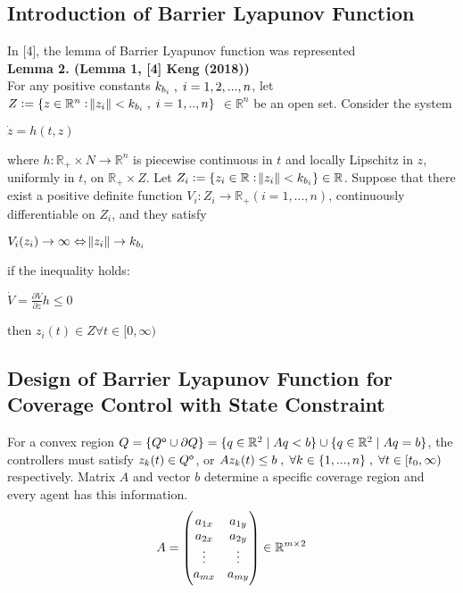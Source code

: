 \subsection{Introduction of Barrier Lyapunov Function}
In [4], the lemma of Barrier Lyapunov function was represented\\
\textbf{Lemma 2. (Lemma 1, [4] Keng (2018))} \\
For any positive constants ${k_{b_i} \txtspc{,} i = 1,2,...,n}$, let ${Z := \{z \in \mathbb{R}^n: \norm{z_i} < k_{b_i} \txtspc{,} i = 1,..,n\}}$ ${\in \mathbb{R}^n}$ be an open set. Consider the system \\
\begin{tightcenter}
	${\dot{z} = h(t,z)}$
\end{tightcenter}
where ${h : \mathbb{R}_+ \times N \rightarrow \mathbb{R}^n}$ is piecewise continuous in ${t}$ and locally Lipschitz in ${z}$, uniformly in ${t}$, on ${\mathbb{R}_+ \times Z}$. Let ${Z_i := \{z_i \in \mathbb{R}: \norm{z_i} < k_{b_i}\} \in \mathbb{R}}$. Suppose that there exist a positive definite function ${V_i : Z_i \rightarrow \mathbb{R}_+ (i = 1,...,n)}$, continuously differentiable on ${Z_i}$, and they satisfy \\
\begin{tightcenter}
${V_i(z_i) \rightarrow \infty \Leftrightarrow \norm{z_i} \rightarrow k_{b_i}}$ \\
\end{tightcenter}
if the inequality holds: \\
\begin{tightcenter}
${\dot{V} = \frac{\partial V}{\partial z}h \leq 0}$
\end{tightcenter}
then ${z_i(t) \in Z \forall t\in [0, \infty)}$\\

\subsection{Design of Barrier Lyapunov Function for Coverage Control with State Constraint}
For a convex region ${Q = \{\interior{Q} \cup \partial{Q} \} = \{q \in \mathbb{R}^2 \txtspc{|} Aq < b\} \cup \{q \in \mathbb{R}^2 \txtspc{|} Aq = b\}}$, the controllers must satisfy ${z_k(t) \in Q^{\mathsf{o}}}$, or ${Az_k(t) \leq b \txtspc{,} \forall k \in \{1,...,n\} \txtspc{,} \forall t \in [t_0, \infty)}$ respectively. Matrix ${A}$ and vector ${b}$ determine a specific coverage region and every agent has this information.\\
\begin{equation} \notag
A = 
\begin{pmatrix}
a_{1x} & a_{1y} \\
a_{2x} & a_{2y} \\
\vdots  & \vdots \\
a_{mx} & a_{my}  
\end{pmatrix} \in \mathbb{R}^{m \times 2}
\end{equation}

